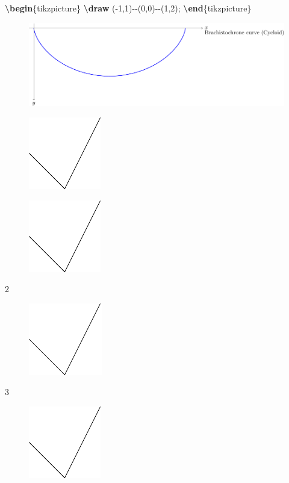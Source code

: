 \documentclass[
]{book}
\newenvironment{Shaded}{\begin{snugshade}}{\end{snugshade}}
\newcommand{\ExtensionTok}[1]{#1}
\newcommand{\FunctionTok}[1]{\textcolor[rgb]{0.13,0.29,0.53}{\textbf{#1}}}
\newcommand{\KeywordTok}[1]{\textcolor[rgb]{0.13,0.29,0.53}{\textbf{#1}}}
\newcommand{\NormalTok}[1]{#1}
\theoremstyle{definition}
\theoremstyle{definition}
\theoremstyle{definition}
\theoremstyle{definition}
\theoremstyle{remark}
\begin{document}
\begin{Shaded}
\begin{Highlighting}[]
\KeywordTok{\textbackslash{}begin}\NormalTok{\{}\ExtensionTok{tikzpicture}\NormalTok{\}}
  \FunctionTok{\textbackslash{}draw}\NormalTok{ ({-}1,1){-}{-}(0,0){-}{-}(1,2);}
\KeywordTok{\textbackslash{}end}\NormalTok{\{}\ExtensionTok{tikzpicture}\NormalTok{\}}
\end{Highlighting}
\end{Shaded}

\begin{figure}
\includegraphics[width=0.05\linewidth]{202401311000-TikZ_files/figure-latex/unnamed-chunk-7-1} \end{figure}

\begin{figure}
\includegraphics[width=0.05\linewidth]{202401311000-TikZ_files/figure-latex/unnamed-chunk-8-1} \end{figure}

\begin{figure}
\includegraphics[width=0.2\linewidth]{202401311000-TikZ_files/figure-latex/unnamed-chunk-9-1} \end{figure}

2

\begin{figure}
\includegraphics[width=0.15\linewidth]{202401311000-TikZ_files/figure-latex/unnamed-chunk-10-1} \end{figure}

3

\begin{figure}
\includegraphics[width=0.25\linewidth]{202401311000-TikZ_files/figure-latex/unnamed-chunk-11-1} \end{figure}
\end{document}
